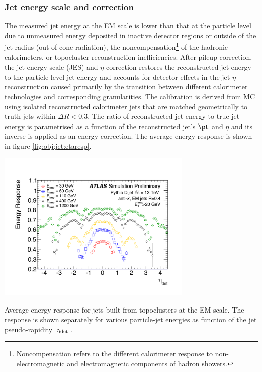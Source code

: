 \subsubsection[Jet energy scale and $\eta$ correction]{Jet energy scale and \boldmath{$\eta$} correction}

The measured jet energy at the EM scale is lower than that at the particle level due to unmeasured energy deposited in inactive detector regions or outside of the jet radius (out-of-cone radiation), the noncompensation\footnote{Noncompensation refers to the different calorimeter response to non-electromagnetic and electromagnetic components of hadron showers.} of the hadronic calorimeters, or topocluster reconstruction inefficiencies.
After pileup correction, the jet energy scale (JES) and $\eta$ correction restores the reconstructed jet energy to the particle-level jet energy and accounts for detector effects in the jet $\eta$ reconstruction caused primarily by the transition between different calorimeter technologies and corresponding granularities. The calibration is derived from MC using isolated reconstructed calorimeter jets that are matched geometrically to truth jets within $\Delta R < 0.3$.  The ratio of reconstructed jet energy to true jet energy is parametrised as a function of the reconstructed jet's $\pt$ and $\eta$ and its inverse is applied as an energy correction. The average energy response is shown in figure \ref{fig:obj:jet:etaresp}.


\bfig[htb!]
\centering
\includegraphics[width=0.7\textwidth]{figures/Objects/EtaJES_FullSim.pdf}
\captionsetup{width=0.85\textwidth} \caption{\small Average energy response for jets built from topoclusters at the EM scale. The response is shown separately for various particle-jet energies as function of the jet pseudo-rapidity $|\eta_{\rm det}|$.}
\label{fig:obj:jet:etaresp}
\efig


